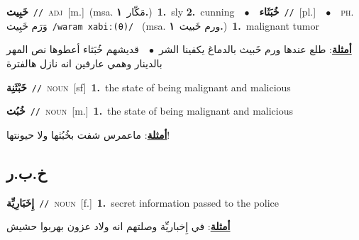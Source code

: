\documentclass[10pt,a4paper,twoside]{article} %
\begin{document}
\begin{multicols}{2}
{\setlength\topsep{0pt}\textbf{\foreignlanguage{arabic}{خَبِيث}}\ {\color{gray}\texttt{//}\color{black}}\ \textsc{adj}\ [m.]\ \color{gray}(msa. \foreignlanguage{arabic}{مَكّار}~\foreignlanguage{arabic}{\textbf{١.}})\color{black}\ \textbf{1.}~sly  \textbf{2.}~cunning\ \ $\bullet$\ \ \setlength\topsep{0pt}\textbf{\foreignlanguage{arabic}{خُبَثَاء}}\ {\color{gray}\texttt{//}\color{black}}\ [pl.]\ \ $\bullet$\ \ \textsc{ph.} \color{gray} \foreignlanguage{arabic}{وَرَم خَبِيث}\color{black}\ {\color{gray}\texttt{/{\sffamily waram xabiː(θ)}/}\color{black}}\ \color{gray} (msa. \foreignlanguage{arabic}{ورم خَبيث}~\foreignlanguage{arabic}{\textbf{١.}})\color{black}\ \textbf{1.}~malignant tumor\  \begin{flushright}\color{gray}\foreignlanguage{arabic}{\textbf{\underline{\foreignlanguage{arabic}{أمثلة}}}: طلع عندها ورم خَبيث بالدماغ يكفينا الشر\ $\bullet$\ \  قديشهم خُبَثاء أعطوها نص المهر بالدينار وهمي عارفين انه نازل هالفترة}\end{flushright}\color{black}} \vspace{2mm}

{\setlength\topsep{0pt}\textbf{\foreignlanguage{arabic}{خَبْثَنِة}}\ {\color{gray}\texttt{//}\color{black}}\ \textsc{noun}\ [sf]\ \textbf{1.}~the state of being malignant and malicious\ 

{\setlength\topsep{0pt}\textbf{\foreignlanguage{arabic}{خُبُث}}\ {\color{gray}\texttt{//}\color{black}}\ \textsc{noun}\ [m.]\ \textbf{1.}~the state of being malignant and malicious\  \begin{flushright}\color{gray}\foreignlanguage{arabic}{\textbf{\underline{\foreignlanguage{arabic}{أمثلة}}}: ماعمرس شفت بخُبُثها ولا حيونتها!}\end{flushright}\color{black}} \vspace{2mm}

\vspace{-3mm}
\subsection*{\color{blue}\foreignlanguage{arabic}{خ.ب.ر}\color{blue}{}} 

{\setlength\topsep{0pt}\textbf{\foreignlanguage{arabic}{إِخَبَارِيِّة}}\ {\color{gray}\texttt{//}\color{black}}\ \textsc{noun}\ [f.]\ \textbf{1.}~secret information passed to the police\  \begin{flushright}\color{gray}\foreignlanguage{arabic}{\textbf{\underline{\foreignlanguage{arabic}{أمثلة}}}: في إِخباريِّة وصلتهم انه ولاد عزون بهربوا حشيش}\end{flushright}\color{black}} \vspace{2mm}

}
\end{multicols}
\end{document}
